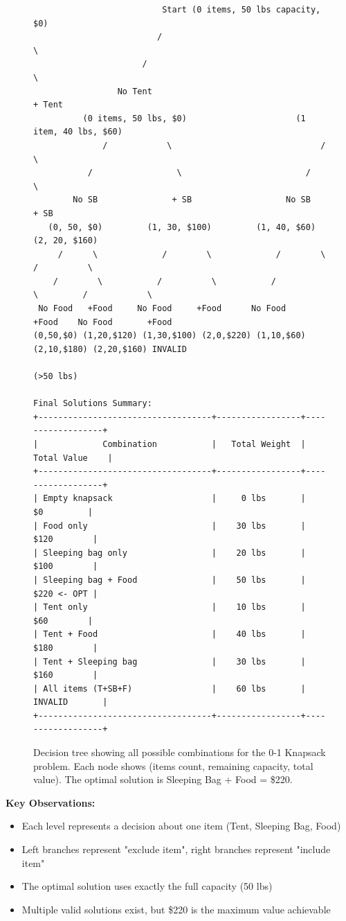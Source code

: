 \documentclass[12pt,a4paper]{article}
\begin{document}
\begin{figure}[h]
\centering
\begin{verbatim}
                          Start (0 items, 50 lbs capacity, $0)
                         /                                    \
                      /                                          \
                 No Tent                                      + Tent
          (0 items, 50 lbs, $0)                      (1 item, 40 lbs, $60)
              /            \                              /                \
           /                 \                         /                    \
        No SB               + SB                   No SB                  + SB
   (0, 50, $0)         (1, 30, $100)         (1, 40, $60)         (2, 20, $160)
     /      \             /        \             /        \           /          \
    /        \           /          \           /          \         /            \
 No Food   +Food     No Food     +Food      No Food     +Food    No Food       +Food
(0,50,$0) (1,20,$120) (1,30,$100) (2,0,$220) (1,10,$60) (2,10,$180) (2,20,$160) INVALID
                                                                                (>50 lbs)

Final Solutions Summary:
+-----------------------------------+-----------------+------------------+
|             Combination           |   Total Weight  |   Total Value    |
+-----------------------------------+-----------------+------------------+
| Empty knapsack                    |     0 lbs       |       $0         |
| Food only                         |    30 lbs       |      $120        |
| Sleeping bag only                 |    20 lbs       |      $100        |
| Sleeping bag + Food               |    50 lbs       |      $220 <- OPT |
| Tent only                         |    10 lbs       |       $60        |
| Tent + Food                       |    40 lbs       |      $180        |
| Tent + Sleeping bag               |    30 lbs       |      $160        |
| All items (T+SB+F)                |    60 lbs       |    INVALID       |
+-----------------------------------+-----------------+------------------+
\end{verbatim}
\caption{Decision tree showing all possible combinations for the 0-1 Knapsack problem. Each node shows (items count, remaining capacity, total value). The optimal solution is Sleeping Bag + Food = \$220.}
\end{figure}

\textbf{Key Observations:}
\begin{itemize}
\item Each level represents a decision about one item (Tent, Sleeping Bag, Food)
\item Left branches represent "exclude item", right branches represent "include item"
\item The optimal solution uses exactly the full capacity (50 lbs)
\item Multiple valid solutions exist, but \$220 is the maximum value achievable
\end{itemize}
\end{document}

